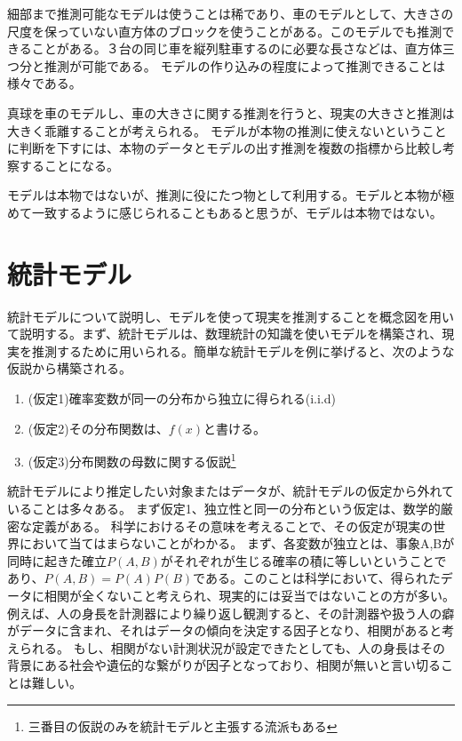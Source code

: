 細部まで推測可能なモデルは使うことは稀であり、車のモデルとして、大きさの尺度を保っていない直方体のブロックを使うことがある。このモデルでも推測できることがある。３台の同じ車を縦列駐車するのに必要な長さなどは、直方体三つ分と推測が可能である。
モデルの作り込みの程度によって推測できることは様々である。

真球を車のモデルし、車の大きさに関する推測を行うと、現実の大きさと推測は大きく乖離することが考えられる。
モデルが本物の推測に使えないということに判断を下すには、本物のデータとモデルの出す推測を複数の指標から比較し考察することになる。


モデルは本物ではないが、推測に役にたつ物として利用する。モデルと本物が極めて一致するように感じられることもあると思うが、モデルは本物ではない。



\section{統計モデル}
統計モデルについて説明し、モデルを使って現実を推測することを概念図を用いて説明する。まず、統計モデルは、数理統計の知識を使いモデルを構築され、現実を推測するために用いられる。簡単な統計モデルを例に挙げると、次のような仮説から構築される。

\begin{enumerate}
    \item (仮定1)確率変数が同一の分布から独立に得られる(i.i.d)
    \item (仮定2)その分布関数は、$f(x)$と書ける。
    \item (仮定3)分布関数の母数に関する仮説\footnote{三番目の仮説のみを統計モデルと主張する流派もある\cite{塩見_正衛2021}}
\end{enumerate}

統計モデルにより推定したい対象またはデータが、統計モデルの仮定から外れていることは多々ある。
まず仮定1、独立性と同一の分布という仮定は、数学的厳密な定義がある。
科学におけるその意味を考えることで、その仮定が現実の世界において当てはまらないことがわかる。
まず、各変数が独立とは、事象A,Bが同時に起きた確立$P(A,B)$がそれぞれが生じる確率の積に等しいということであり、$P(A,B)=P(A)P(B)$である。このことは科学において、得られたデータに相関が全くないこと考えられ、現実的には妥当ではないことの方が多い。例えば、人の身長を計測器により繰り返し観測すると、その計測器や扱う人の癖がデータに含まれ、それはデータの傾向を決定する因子となり、相関があると考えられる。
もし、相関がない計測状況が設定できたとしても、人の身長はその背景にある社会や遺伝的な繋がりが因子となっており、相関が無いと言い切ることは難しい。

